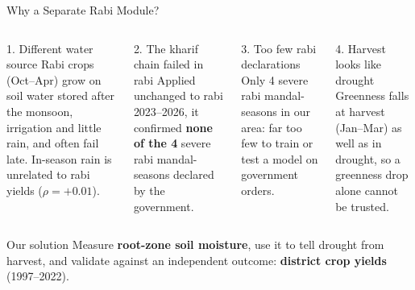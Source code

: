 \documentclass[aspectratio=169,10pt]{beamer}
\begin{document}
\begin{frame}{Why a Separate Rabi Module?}
\begin{columns}[T,onlytextwidth]
\begin{warncard}{1. Different water source}
\footnotesize Rabi crops (Oct--Apr) grow on soil water stored after the monsoon, irrigation and little rain, and often fail late. In-season rain is unrelated to rabi yields ($\rho = +0.01$).
\end{warncard}
\begin{warncard}{2. The kharif chain failed in rabi}
\footnotesize Applied unchanged to rabi 2023--2026, it confirmed \textbf{none of the 4} severe rabi mandal-seasons declared by the government.
\end{warncard}
\begin{warncard}{3. Too few rabi declarations}
\footnotesize Only 4 severe rabi mandal-seasons in our area: far too few to train or test a model on government orders.
\end{warncard}
\begin{warncard}{4. Harvest looks like drought}
\footnotesize Greenness falls at harvest (Jan--Mar) as well as in drought, so a greenness drop alone cannot be trusted.
\end{warncard}
\end{columns}
\vspace{3mm}
\begin{keycard}{Our solution}
\footnotesize Measure \textbf{root-zone soil moisture}, use it to tell drought from harvest, and validate against an independent outcome: \textbf{district crop yields} (1997--2022).
\end{keycard}
\end{frame}
\end{document}
